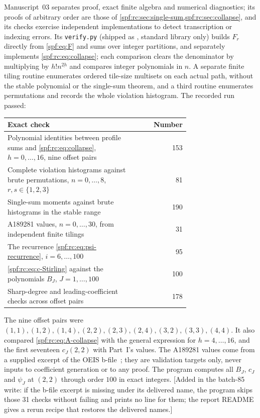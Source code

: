 \documentclass[11pt]{article}
\numberwithin{equation}{section}
\theoremstyle{definition}
\theoremstyle{remark}
\theoremstyle{definition}
\newcommand{\fall}[2]{{#1}^{\underline{#2}}}
\begin{document}
Manuscript~03 separates proof, exact finite algebra and numerical
diagnostics; its proofs of arbitrary order are those of
\cref{spf:rc:sec:single-sum,spf:rc:sec:collapse}, and its checks exercise
independent implementations to detect transcription or indexing errors.
Its \texttt{verify.py} (shipped as
, standard library only) builds
$F_r$ directly from \eqref{spf:eq:F} and sums over integer partitions, and
separately implements \eqref{spf:rc:eq:collapse}; each comparison clears the
denominator by multiplying by $h!\fall n{2h}$ and compares integer
polynomials in $n$. A separate finite tiling routine enumerates ordered
tile-size multisets on each actual path, without the stable polynomial or
the single-sum theorem, and a third routine enumerates permutations and
records the whole violation histogram. The recorded run passed:
\begin{center}
\small
\renewcommand{\arraystretch}{1.15}
\begin{tabular}{p{0.72\linewidth}r}
\toprule
Exact check & Number\\
\midrule
Polynomial identities between profile sums and \eqref{spf:rc:eq:collapse},
$h=0,\ldots,16$, nine offset pairs & 153\\
Complete violation histograms against brute permutations, $n=0,\ldots,8$,
$r,s\in\{1,2,3\}$ & 81\\
Single-sum moments against brute histograms in the stable range & 190\\
A189281 values, $n=0,\ldots,30$, from independent finite tilings & 31\\
The recurrence \eqref{spf:rc:eq:psi-recurrence}, $i=6,\ldots,100$ & 95\\
\eqref{spf:rc:eq:c-Stirling} against the polynomials $B_J$, $J=1,\ldots,100$ & 100\\
Sharp-degree and leading-coefficient checks across offset pairs & 178\\
\bottomrule
\end{tabular}
\end{center}
The nine offset pairs were $(1,1),(1,2),(1,4),(2,2),(2,3),(2,4),(3,2),(3,3),(4,4)$.
It also compared \eqref{spf:rc:eq:A-collapse} with the general expression for
$h=4,\ldots,16$, and the first seventeen $c_J(2,2)$ with Part~I's values. The
A189281 values come from a supplied excerpt of the OEIS
b-file~\cite{rcBfile}; they are validation targets only, never inputs to
coefficient generation or to any proof. The program computes all $B_J$,
$c_J$ and $\psi_J$ at $(2,2)$ through order $100$ in exact integers.
[Added in the batch-85 write: if the b-file excerpt is missing under its
delivered name, the program skips those 31 checks without failing and prints
no line for them; the report README gives a rerun recipe that restores the
delivered names.]
\end{document}
